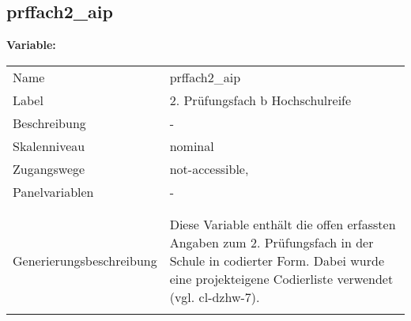 	
	
	\subsection{prffach2\_aip}
	\label{subSection:prffach2_aip}

	\noindent\textbf{Variable:}\\
		\begin{tabular}{lL{11.3cm}}
			\label{tableVariable:prffach2_aip}
			Name & prffach2\_aip \\
			Label & 2. Prüfungsfach b Hochschulreife \\
			Beschreibung & - \\
			Skalenniveau & nominal \\
			Zugangswege &
				not-accessible,
 \\
			Panelvariablen & -
			 \\
			 \\
 \\
					Generierungsbeschreibung & Diese Variable enthält die offen erfassten Angaben zum 2. Prüfungsfach in der Schule in codierter Form. Dabei wurde eine projekteigene Codierliste verwendet (vgl. cl-dzhw-7).
				 \\	
			 \\
		\end{tabular}






	
	\newpage
